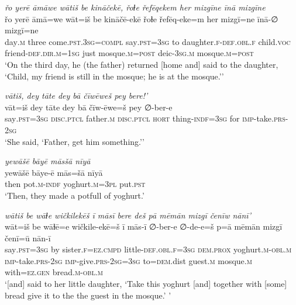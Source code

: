 \ea \label{ŽH.37}
\textit{řo yerē āmāwe wātiš be kināčekē, řoɫe řefēqekem her mizgīne īnā mizgīne} \\ 
\gll řo yerē āmā=we wāt=iš be kināčē-ekē řoɫe řefēq-eke=m her mizgī=ne īnā-∅ mizgī=ne \\ 
 day\textsc{.m} three come\textsc{.pst}\textsc{.3sg}\textsc{=compl} say\textsc{.pst}\textsc{=3sg} to daughter\textsc{\textsc{.f}}\textsc{-def}\textsc{.obl}\textsc{\textsc{.f}} child.\textsc{voc} friend\textsc{-def}\textsc{.dir}\textsc{.m}\textsc{=1sg} just mosque\textsc{.m}\textsc{=\textsc{post}} deic\textsc{-3sg}\textsc{.m} mosque\textsc{.m}\textsc{=\textsc{post}} \\ 
\glt `On the third day, he (the father) returned [home and] said to the daughter, ‘Child, my friend is still in the mosque; he is at the mosque.’'
\z 
 
\ea \label{ŽH.38}
\textit{vātiš, dey tāte dey bā čīwēweš pey bere!’} \\ 
\gll vāt=iš dey tāte dey bā čīw-ēwe=š pey ∅-ber-e \\ 
 say\textsc{.pst}\textsc{=3sg} \textsc{disc.ptcl} father\textsc{.m} \textsc{disc.ptcl} \textsc{hort} thing\textsc{-indf}\textsc{=3sg} for \textsc{imp-}take\textsc{.prs}-\textsc{2sg} \\ 
\glt `She said, ‘Father, get him something.’'
\z 
 
\ea \label{ŽH.39}
\textit{yewāšē bāyē māsšā nīyā} \\ 
\gll yewāšē bāye-ē mās=šā nīyā \\ 
 then pot\textsc{.m}\textsc{-indf} yoghurt\textsc{.m}\textsc{=3pl} put\textsc{.pst} \\ 
\glt `Then, they made a potfull of yoghurt.'
\z 
 
\ea \label{ŽH.40}
\textit{wātiš be wāɫe wičkilekēš ī māsī bere deš pā mēmān mizgī čenīw nānī’} \\ 
\gll wāt=iš be wāɫē=e wičkile-ekē=š ī mās-ī ∅-ber-e ∅-de-e=š p=ā mēmān mizgī čenī=ū nān-ī \\ 
 say\textsc{.pst}\textsc{=3sg} by sister\textsc{\textsc{.f}}\textsc{=ez}\textsc{.cmpd} little\textsc{-def}\textsc{.obl}\textsc{\textsc{.f}}\textsc{=3sg} \textsc{dem.prox} yoghurt\textsc{.m}\textsc{-obl}\textsc{.m} \textsc{imp-}take\textsc{.prs}-\textsc{2sg} \textsc{imp-}give\textsc{.prs}-\textsc{2sg}\textsc{=3sg} to\textsc{=dem}.dist guest\textsc{.m} mosque\textsc{.m} with\textsc{=ez}\textsc{.gen} bread\textsc{.m}\textsc{-obl}\textsc{.m} \\ 
\glt `[and] said to her little daughter, ‘Take this yoghurt [and] together with [some] bread give it to the the guest in the mosque.’ '
\z 
 
